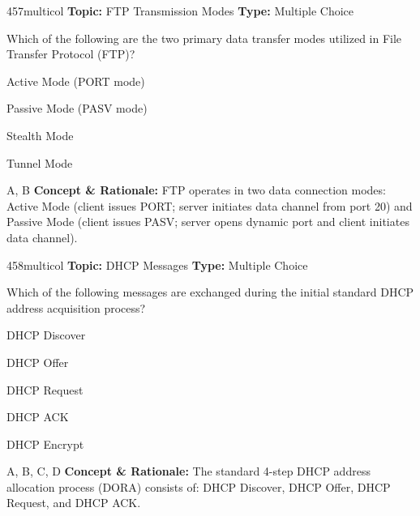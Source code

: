 \begin{qcard}{457}{multicol}
\textcolor{darkslate!75}{\small\textbf{Topic:} FTP Transmission Modes \hfill \textbf{Type:} Multiple Choice}\vspace{0.4em}\par
Which of the following are the two primary data transfer modes utilized in File Transfer Protocol (FTP)?
\begin{qoptions}
\item Active Mode (PORT mode)
\item Passive Mode (PASV mode)
\item Stealth Mode
\item Tunnel Mode
\end{qoptions}
\end{qcard}
\nopagebreak
\begin{explainbox}{A, B}
\textbf{Concept \& Rationale:} FTP operates in two data connection modes: Active Mode (client issues PORT; server initiates data channel from port 20) and Passive Mode (client issues PASV; server opens dynamic port and client initiates data channel).
\end{explainbox}

\begin{qcard}{458}{multicol}
\textcolor{darkslate!75}{\small\textbf{Topic:} DHCP Messages \hfill \textbf{Type:} Multiple Choice}\vspace{0.4em}\par
Which of the following messages are exchanged during the initial standard DHCP address acquisition process?
\begin{qoptions}
\item DHCP Discover
\item DHCP Offer
\item DHCP Request
\item DHCP ACK
\item DHCP Encrypt
\end{qoptions}
\end{qcard}
\nopagebreak
\begin{explainbox}{A, B, C, D}
\textbf{Concept \& Rationale:} The standard 4-step DHCP address allocation process (DORA) consists of: DHCP Discover, DHCP Offer, DHCP Request, and DHCP ACK.
\end{explainbox}

